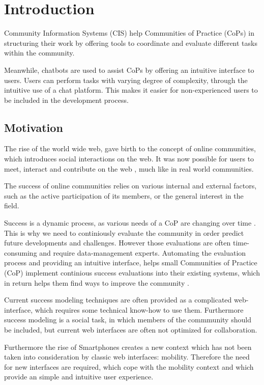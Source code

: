 \chapter{Introduction}
Community Information Systems (CIS) help Communities of Practice (CoPs) in structuring their work by offering tools to coordinate and evaluate different tasks within the community.

Meanwhile, chatbots are used to assist CoPs by offering an intuitive interface to users. Users can perform tasks with varying degree of complexity, through the intuitive use of a chat platform. This makes it easier for non-experienced users to be included in the development process.

\section{Motivation}
The rise of the world wide web, gave birth to the concept of online communities, which introduces social interactions on the web. It was now possible for users to meet, interact and contribute on the web \cite{Renz08}, much like in real world communities.

The success of online communities relies on various internal and external factors, such as the active participation of its members, or the general interest in the field.

Success is a dynamic process, as various needs of a CoP are changing over time \cite{Renz08,GKJa08}. This is why we need to continiously evaluate the community in order predict future developments and challenges. However those evaluations are often time-consuming and require data-management experts. Automating the evaluation process and providing an intuitive interface, helps small Communities of Practice (CoP) implement continious success evaluations into their existing systems, which in return helps them find ways to improve the community \cite{Renz08}.

Current success modeling techniques are often provided as a complicated web-interface, which requires some technical know-how to use them. Furthermore success modeling is a social task, in which members of the commmunity should be included, but current web interfaces are often not optimized for collaboration.

Furthermore the rise of Smartphones creates a new context which has not been taken into consideration by classic web interfaces: mobility.
Therefore the need for new interfaces are required, which cope with the mobility context and which provide an simple and intuitive user experience.


